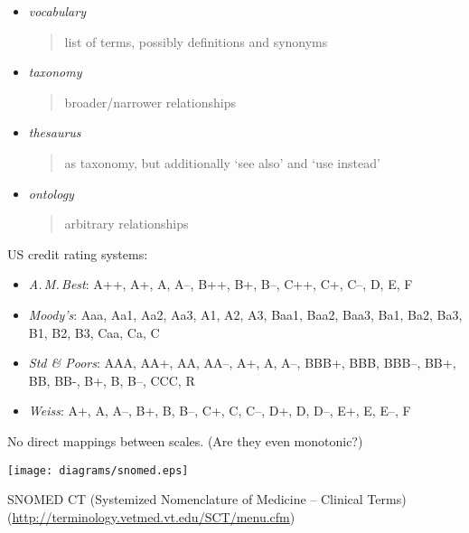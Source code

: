 \documentclass{sepslide-soa-faked} %
\begin{document}
\begin{slide}
\begin{itemize}
\item \emph{vocabulary}
\begin{quote}
list of terms, possibly definitions and synonyms
\end{quote}
\item \emph{taxonomy}
\begin{quote}
broader/narrower relationships
\end{quote}
\item \emph{thesaurus}
\begin{quote}
as taxonomy, but additionally `see also' and `use instead'
\end{quote}
\item \emph{ontology}
\begin{quote}
arbitrary relationships
\end{quote}
\end{itemize}
\end{slide}

\begin{slide}
US credit rating systems:
\begin{itemize} 
\item \textit{A.\,M.\,Best}:
  A++, A+, A, A--, B++, B+, B--, C++, C+, C--, D, E, F
\item \textit{Moody's}:
  Aaa, Aa1, Aa2, Aa3, A1, A2, A3, Baa1, Baa2, Baa3, Ba1, Ba2, Ba3, B1, B2, B3, Caa, Ca, C
\item \textit{Std \& Poors}:
  AAA, AA+, AA, AA--, A+, A, A--, BBB+, BBB, BBB--, BB+, BB, BB-, B+, B, B--, CCC, R
\item \textit{Weiss}:
  A+, A, A--, B+, B, B--, C+, C, C--, D+, D, D--, E+, E, E--, F
\end{itemize}
No direct mappings between scales. 
(Are they even monotonic?)
\end{slide}

\begin{slide}
\begin{flushleft}
\texttt{[image: diagrams/snomed.eps]}
\end{flushleft}
SNOMED CT (Systemized Nomenclature of Medicine -- Clinical Terms) 
(\url{http://terminology.vetmed.vt.edu/SCT/menu.cfm})
\end{slide}
\end{document}
